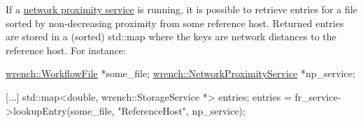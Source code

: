 If a \hyperlink{guide-networkproximity}{network proximity service} is running, it is possible to retrieve entries for a file sorted by non-\/decreasing proximity from some reference host. Returned entries are stored in a (sorted) {\ttfamily std\+::map} where the keys are network distances to the reference host. For instance\+:


\begin{DoxyCode}
\hyperlink{classwrench_1_1_workflow_file}{wrench::WorkflowFile} *some\_file;
\hyperlink{classwrench_1_1_network_proximity_service}{wrench::NetworkProximityService} *np\_service;

[...]
std::map<double, wrench::StorageService *> entries;
entries = fr\_service->lookupEntry(some\_file, \textcolor{stringliteral}{"ReferenceHost"}, np\_service);
\end{DoxyCode}
 